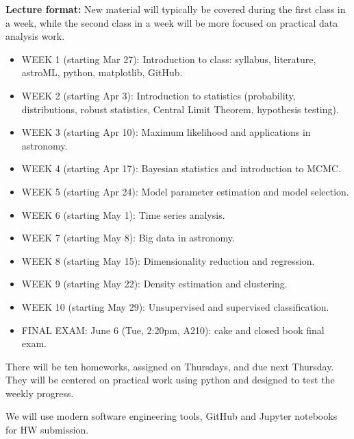 \documentclass[10pt]{article}
\begin{document}
{\bf Lecture format:}
New material will typically be covered during the first class in a week, while
the second class in a week will be more focused on practical data analysis work. 

\newpage 
\begin{itemize}
\item WEEK 1 (starting Mar 27): 
      Introduction to class: syllabus, literature, astroML, python, matplotlib, GitHub. 
      
\item WEEK  2 (starting Apr 3):  Introduction to statistics (probability, distributions, 
             robust statistics, Central Limit Theorem,  hypothesis testing).

\item WEEK  3 (starting Apr 10):  Maximum likelihood and applications in astronomy.

\item WEEK  4 (starting Apr 17):  Bayesian statistics and introduction to MCMC.

\item WEEK  5 (starting Apr 24):  Model parameter estimation and model selection.

\item WEEK  6 (starting May 1):   Time series analysis.

\item WEEK  7 (starting May 8):   Big data in astronomy.

\item WEEK  8 (starting May 15): Dimensionality reduction and regression.

\item WEEK  9 (starting May 22):  Density estimation and clustering.

\item WEEK  10 (starting May 29):  Unsupervised and supervised classification.

\item FINAL EXAM: June 6 (Tue, 2:20pm, A210): cake and closed book final exam.

\end{itemize}


\vskip 0.2in


There will be ten homeworks, assigned on Thursdays, and due next Thursday. They will
be centered on practical work using python and designed to test the weekly progress. 

We will use modern software engineering tools, GitHub and Jupyter notebooks for HW submission. 
\end{document}
